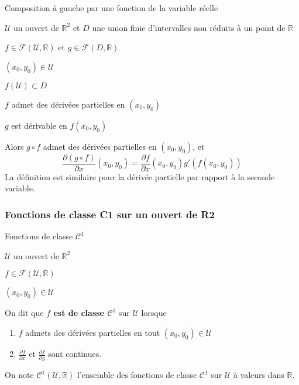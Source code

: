    \begin{prop}{Composition à gauche par une fonction de la variable réelle}{}
        \begin{soient}
            \item $\mathcal{U}$ un ouvert de $\mathbb{R}^2$ et $D$ une union finie d’intervalles non réduits à un point de $\mathbb{R}$
            \item $f\in \mathcal{F}(\mathcal{U},\mathbb{R})$ et $ g \in \mathcal{F}(D,\mathbb{R})$
            \item $(x_0,y_0) \in \mathcal{U}$
        \end{soient}
        \begin{suppose}
            \item $f(\mathcal{U}) \subset D$
            \item $f$ admet des dérivées partielles en $(x_0,y_0)$
            \item $g$ est dérivable en $f(x_0,y_0)$
        \end{suppose}
        Alors $g \circ f$ admet des dérivées partielles en $(x_0,y_0)$, et 
        \[ \frac{\partial (g \circ f)}{\partial x}(x_0,y_0) = \frac{\partial f}{\partial x}(x_0,y_0) g'(f(x_0,y_0)) \] 
        La définition est similaire pour la dérivée partielle par rapport à la seconde variable.
    \end{prop}

    \subsubsection{Fonctions de classe C1 sur un ouvert de R2}

    \begin{defi}{Fonctions de classe $\mathcal{C}^1$}{}
        \begin{soient}
            \item $\mathcal{U}$ un ouvert de $\mathbb{R}^2$
            \item $f\in \mathcal{F}(\mathcal{U},\mathbb{R})$
            \item $(x_0,y_0) \in \mathcal{U}$
        \end{soient}
        On dit que \textbf{$f$ est de classe $\mathcal{C}^1$} sur $\mathcal{U}$ lorsque 
        \begin{enumerate}
            \item $f$ admets des dérivées partielles en tout $(x_0,y_0) \in \mathcal{U}$
            \item $\frac{\partial f}{\partial x}$ et $\frac{\partial f}{\partial y}$ sont continues.
        \end{enumerate}
        On note $\mathcal{C}^1(\mathcal{U},\mathbb{R})$ l’ensemble des fonctions de classe $\mathcal{C}^1$ sur $\mathcal{U}$ à valeurs dans $\mathbb{R}$.
    \end{defi}


